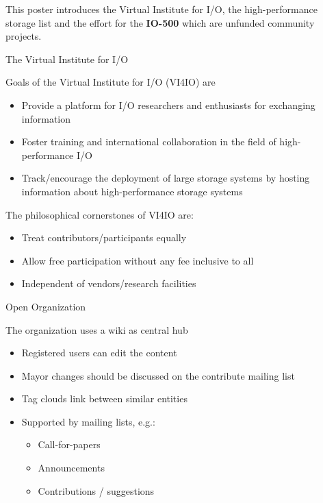 \documentclass[portrait,a0paper,fontscale=0.4]{baposter}
\newcommand{\compresslist}{%
\setlength{\itemsep}{1pt}%
\setlength{\parskip}{0pt}%
\setlength{\parsep}{0pt}%
}
\begin{document}
\begin{poster}
\begin{posterbox}[name=problem,column=0]
This poster introduces the Virtual Institute for I/O, the high-performance storage list and the effort for the \textbf{IO-500} which are unfunded community projects.
\end{posterbox}


\begin{posterbox}[name=approach,column=0,below=problem]
{The Virtual Institute for I/O}


Goals of the Virtual Institute for I/O (VI4IO) are
\vspace*{-1em}
\begin{itemize}\compresslist
\item Provide a platform for I/O researchers and enthusiasts for exchanging information
\item Foster training and international collaboration in the field of high-performance I/O
\item Track/encourage the deployment of large storage systems by hosting information about high-performance storage systems
\end{itemize}
\vspace*{-1em}

The philosophical cornerstones of VI4IO are:

\vspace*{-1em}
\begin{itemize}\compresslist
\item Treat contributors/participants equally
\item Allow free participation without any fee inclusive to all
\item Independent of vendors/research facilities
\end{itemize}
\end{posterbox}


\begin{posterbox}[name=overview,column=0,below=approach]{Open Organization}

The organization uses a wiki as central hub
\vspace*{-1em}
\begin{itemize}\compresslist
\item Registered users can edit the content
\item Mayor changes should be discussed on the contribute mailing list
\item Tag clouds link between similar entities
\item Supported by mailing lists, e.g.:
\begin{itemize}\compresslist
\item Call-for-papers
\item Announcements
\item Contributions / suggestions
\end{itemize}
\end{itemize}


\end{posterbox}
\end{poster}
\end{document}
